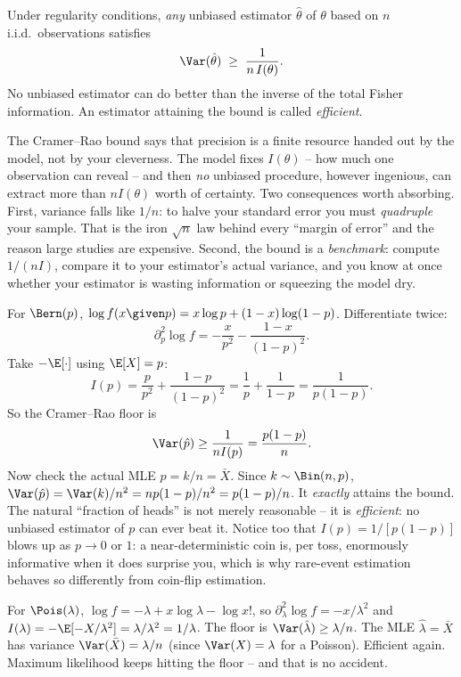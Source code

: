 \begin{theorem}
\label{ch30:thm-crlb}
Under regularity conditions, \emph{any} unbiased estimator $\hat\theta$ of
$\theta$ based on $n$ i.i.d.\ observations satisfies
\[
  \Var(\hat\theta) \;\ge\; \frac{1}{n\,I(\theta)}.
\]
No unbiased estimator can do better than the inverse of the total Fisher
information. An estimator attaining the bound is called \emph{efficient}.
\end{theorem}

\begin{happeningbox}
The Cramer--Rao bound says that precision is a finite resource handed out by the
model, not by your cleverness. The model fixes $I(\theta)$ -- how much one
observation can reveal -- and then \emph{no} unbiased procedure, however
ingenious, can extract more than $nI(\theta)$ worth of certainty. Two
consequences worth absorbing. First, variance falls like $1/n$: to halve your
standard error you must \emph{quadruple} your sample. That is the iron $\sqrt n$
law behind every ``margin of error'' and the reason large studies are
expensive. Second, the bound is a \emph{benchmark}: compute $1/(nI)$, compare it
to your estimator's actual variance, and you know at once whether your estimator
is wasting information or squeezing the model dry.
\end{happeningbox}

\begin{example}[The CRLB for a coin, and why $\hat p=k/n$ is efficient]
\label{ch30:ex-crlb-bern}
For $\Bern(p)$, $\log f(x\given p)=x\log p+(1-x)\log(1-p)$. Differentiate twice:
\[
  \partial_p^2 \log f = -\frac{x}{p^2} - \frac{1-x}{(1-p)^2}.
\]
Take $-\E[\cdot]$ using $\E[X]=p$:
\[
  I(p) = \frac{p}{p^2} + \frac{1-p}{(1-p)^2}
       = \frac1p + \frac1{1-p}
       = \frac{1}{p(1-p)}.
\]
So the Cramer--Rao floor is
\[
  \Var(\hat p) \ge \frac{1}{nI(p)} = \frac{p(1-p)}{n}.
\]
Now check the actual MLE $\hat p=k/n=\bar X$. Since $k\sim\Bin(n,p)$,
$\Var(\hat p) = \Var(k)/n^2 = np(1-p)/n^2 = p(1-p)/n$. It \emph{exactly} attains
the bound. The natural ``fraction of heads'' is not merely reasonable -- it is
\emph{efficient}: no unbiased estimator of $p$ can ever beat it. Notice too that
$I(p)=1/[p(1-p)]$ blows up as $p\to 0$ or $1$: a near-deterministic coin is, per
toss, enormously informative when it does surprise you, which is why rare-event
estimation behaves so differently from coin-flip estimation.
\end{example}

\begin{example}
\label{ch30:ex-crlb-pois}
For $\Pois(\lambda)$, $\log f = -\lambda + x\log\lambda - \log x!$, so
$\partial_\lambda^2 \log f = -x/\lambda^2$ and
$I(\lambda) = -\E[-X/\lambda^2] = \lambda/\lambda^2 = 1/\lambda$. The floor is
$\Var(\hat\lambda)\ge \lambda/n$. The MLE $\hat\lambda=\bar X$ has variance
$\Var(\bar X)=\lambda/n$ (since $\Var(X)=\lambda$ for a Poisson). Efficient
again. Maximum likelihood keeps hitting the floor -- and that is no accident.
\end{example}

